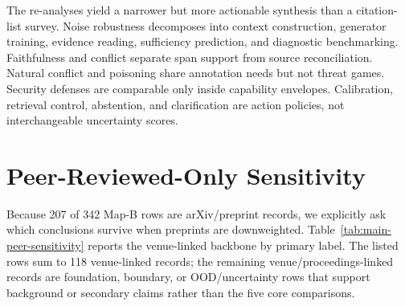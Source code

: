 \documentclass[11pt]{article}
\begin{document}


The re-analyses yield a narrower but more actionable synthesis than a citation-list survey. Noise robustness decomposes into context construction, generator training, evidence reading, sufficiency prediction, and diagnostic benchmarking. Faithfulness and conflict separate span support from source reconciliation. Natural conflict and poisoning share annotation needs but not threat games. Security defenses are comparable only inside capability envelopes. Calibration, retrieval control, abstention, and clarification are action policies, not interchangeable uncertainty scores.

\section{Peer-Reviewed-Only Sensitivity}

Because 207 of 342 Map-B rows are arXiv/preprint records, we explicitly ask which conclusions survive when preprints are downweighted. Table~\ref{tab:main-peer-sensitivity} reports the venue-linked backbone by primary label. The listed rows sum to 118 venue-linked records; the remaining venue/proceedings-linked records are foundation, boundary, or OOD/uncertainty rows that support background or secondary claims rather than the five core comparisons.
\end{document}
